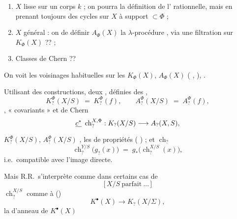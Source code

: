 \documentclass[11pt,a4paper]{article}
\begin{document}
\begin{enumerate}
  \item $X$  lisse  sur un
    \struck{\ill{}} corps $k$ ; on pourra \ill{} la définition
     de l' rationnelle, mais en
    prenant toujours des cycles sur $X$ à support $\subset \Phi$ ;
  \item $X$ général : on  de définir $A_{\Phi}(X)$ \ill{}
    la $\lambda$-procédure , via une filtration sur
    $K_{\Phi}(X)$ ?? ;
  \item Classes de Chern  ??
\end{enumerate}


On voit les voisinages habituelles  sur les
$K_{\Phi}(X)$, $A_{\Phi}(X)$ \ill{} \ill{} ( \ill{},
  \struck{\ill{}} \ill{}), \ill{}
  \ill{} 
\ill{}  \ill{} .

Utilisant des constructions, \ill{} deux ,
définies des ,
\[
  K^{\Phi}_{?}(X/S) \;=\; K^{\Phi}_{?}(f),
  \qquad
  A^{\Phi}_{?}(X/S) \;=\; A^{\Phi}_{?}(f),
\]
  , \ill{} \ill{}
\ill{} « covariants » \ill{} et  de Chern
\[
  \struck{c^{\ast}}\ \operatorname{ch}^{X,\Phi}_{?} : K_{?}(X/S) \longrightarrow
  A_{?}(X,S),
\]
$K^{\Phi}_{?}(X/S)$, $A^{\Phi}_{?}(X/S)$ ,
\struck{\ill{} \ill{}} les  de propriétés
 
( ) ; et $\operatorname{ch}_{?}$
\[
  \operatorname{ch}^{Y/S}_{?}\bigl(g_{?}(x)\bigr)
  \;=\; g_{*}\bigl(\operatorname{ch}^{X/S}_{?}(x)\bigr) ,
\]
i.e.\ compatible   avec l'image directe.

Mais R.R.\ s'interprète comme  dans certains cas
\struck{\ill{}} \ill{} \ill{} de
\[
  \bigl[\,X/S \ \text{parfait} \ \ldots\,\bigr]
\]
 $\operatorname{ch}^{X/S}_{?}$ comme
 \ill{} \ill{} \ill{} à \ill{} ()
\[
  K^{\bullet}(X) \longrightarrow K_{?}(X/\Sigma) ,
\]
\ill{}  la  d'anneau de
$K^{\bullet}(X)$ \ill{}
\end{document}
